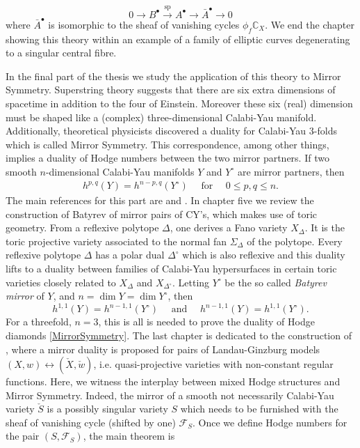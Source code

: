 \documentclass{article}
\newcommand{\calF}{\mathcal{F}}
\newcommand{\CC}{\mathbb{C}}
\newcommand {\lra}  {\longrightarrow}
\numberwithin{equation}{section}
\begin{document}
\[
0 \lra B^\bullet \xrightarrow{\mathrm{sp}} A^\bullet \lra \bar A^\bullet \lra 0
\]
where $\bar A^\bullet$ is isomorphic to the sheaf of vanishing cycles $\phi_f \CC_X$. We end the chapter showing this theory within an example of a family of elliptic curves degenerating to a singular central fibre.

%
%

In the final part of the thesis we study the application of this theory to Mirror Symmetry.
Superstring theory suggests that there are six extra dimensions of spacetime in addition to the four of Einstein. Moreover these six (real) dimension must be shaped like a (complex) three-dimensional Calabi-Yau manifold. Additionally, theoretical physicists discovered a duality for Calabi-Yau $3$-folds which is called Mirror Symmetry. This correspondence, among other things, implies a duality of Hodge numbers between the two mirror partners. 
If two smooth $n$-dimensional Calabi-Yau manifolds $Y$ and $Y^\circ$ are mirror partners, then
\begin{align} \label{MirrorSymmetry}
 h^{p,q}(Y) = h^{n-p,q}(Y^\circ) \quad \text{ for } \quad  0 \leq p,q \leq n.
\end{align}
The main references for this part are \cite{CK99} and \cite{CLS11}.
In chapter five we review the construction of Batyrev of mirror pairs of CY's, which makes use of toric geometry. From a reflexive polytope $\Delta$, one derives a Fano variety $X_\Delta$. It is the toric projective variety associated to the normal fan $\Sigma_\Delta$ of the polytope. Every reflexive polytope $\Delta$ has a polar dual $\Delta^\circ$ which is also reflexive and this duality lifts to a duality between families of Calabi-Yau hypersurfaces in certain toric varieties closely related to $X_\Delta$ and $X_{\Delta^\circ}$. Letting $Y^\circ$ be the so called \emph{Batyrev mirror} of $Y$, and $n=\dim Y = \dim Y^\circ$, then 
\[
h^{1,1}(Y) = h^{n-1,1}(Y^\circ) \quad \text{ and } \quad  h^{n-1,1}(Y) = h^{1,1}(Y^\circ).
\]
For a threefold, $n=3$, this is all is needed to prove the duality of Hodge diamonds \eqref{MirrorSymmetry}.
The last chapter is dedicated to the construction of \cite{GKR17}, where a mirror duality is proposed for pairs of Landau-Ginzburg models $(X,w) \leftrightarrow (\check{X}, \check{w})$, i.e. quasi-projective varieties with non-constant regular functions.    
Here, we witness the interplay between mixed Hodge structures and Mirror Symmetry. Indeed, the mirror of a smooth not necessarily Calabi-Yau variety $\check{S}$ is a possibly singular variety $S$ which needs to be furnished with the sheaf of vanishing cycle (shifted by one) $\calF_S$. Once we define Hodge numbers for the pair $(S,\calF_S)$, the main theorem is 
\end{document}
